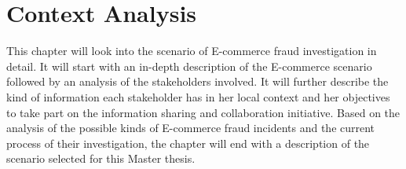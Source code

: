 
\chapter{Context Analysis} %
\label{cha:context_analysis}

This chapter will look into the scenario of E-commerce fraud investigation in detail. It will start with an in-depth description of the E-commerce scenario followed by an analysis of the stakeholders involved. It will further describe the kind of information each stakeholder has in her local context and her objectives to take part on the information sharing and collaboration initiative. Based on the analysis of the possible kinds of E-commerce fraud incidents and the current process of their investigation, the chapter will end with a description of the scenario selected for this Master thesis.









